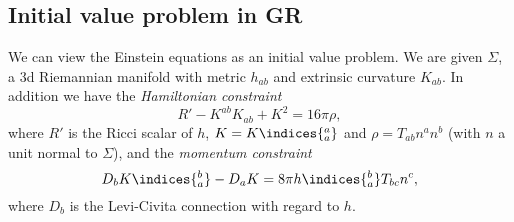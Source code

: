 \documentclass{jknotes}
\begin{document}
\subsection{Initial value problem in GR}
We can view the Einstein equations as an initial value problem. We are given \(\Sigma\), a 3d Riemannian manifold with metric \(h_{ab}\) and extrinsic curvature \(K_{ab}\). In addition we have the \emph{Hamiltonian constraint}
\begin{equation}
    R' - K^{ab}K_{ab} + K^2 = 16\pi\rho,
\end{equation}
where \(R'\) is the Ricci scalar of \(h\), \(K=K\indices{_a^a}\) and \(\rho = T_{ab}n^an^b\) (with \(n\) a unit normal to \(\Sigma\)), and the \emph{momentum constraint}
\begin{equation}
    D_bK\indices{^b_a} - D_aK = 8\pi h\indices{_a^b}T_{bc}n^c,
\end{equation}
where \(D_b\) is the Levi-Civita connection with regard to \(h\).
\end{document}
